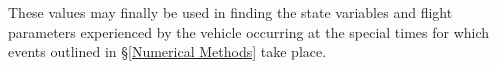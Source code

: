 \documentclass[11pt]{thesis}
\numberwithin{equation}{section}
\begin{document}
These values may finally be used in finding the state variables and flight parameters experienced by the vehicle occurring at the special times for which events outlined in \S\ref{Numerical Methods} take place. 
%
\end{document}
